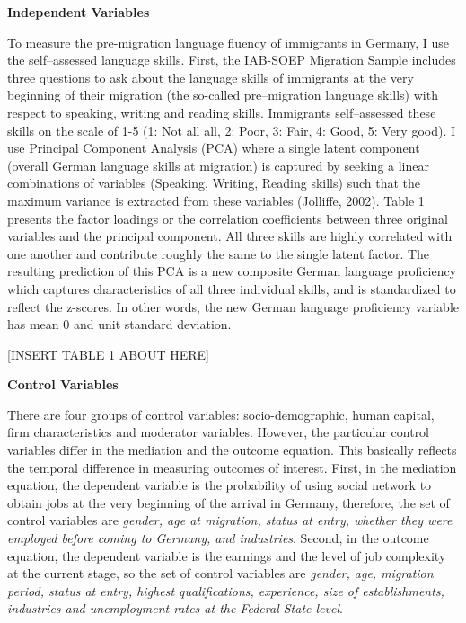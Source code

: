 \documentclass[12pt,a4paper]{article}
\begin{document}
\begin{flushleft}
\textbf{Independent Variables} 
\end{flushleft}

To measure the pre-migration language fluency of immigrants in Germany, I use the self--assessed language skills. First, the IAB-SOEP Migration Sample includes three questions to ask about the language skills of immigrants at the very beginning of their migration (the so-called pre--migration language skills) with respect to speaking, writing and reading skills. Immigrants self--assessed these skills on the scale of 1-5 (1: Not all all, 2: Poor, 3: Fair, 4: Good, 5: Very good). I use Principal Component Analysis (PCA) where a single latent component (overall German language skills at migration) is captured by seeking a linear combinations of variables (Speaking, Writing, Reading skills) such that the maximum variance is extracted from these variables (Jolliffe, 2002). Table 1 presents the factor loadings or the correlation coefficients between three original variables and the principal component. All three skills are highly correlated with one another and contribute roughly the same to the single latent factor. The resulting prediction of this PCA is a new composite German language proficiency which captures characteristics of all three individual skills, and is standardized to reflect the z-scores. In other words, the new German language proficiency variable has mean 0 and unit standard deviation. 

\begin{center}
[INSERT TABLE 1 ABOUT HERE]
\end{center}

\begin{flushleft}
\textbf{Control Variables} 
\end{flushleft}

There are four groups of control variables: socio-demographic, human capital, firm characteristics and moderator variables. However, the particular control variables differ in the mediation and the outcome equation. This basically reflects the temporal difference in measuring outcomes of interest. First, in the mediation equation, the dependent variable is the probability of using social network to obtain jobs at the very beginning of the arrival in Germany, therefore, the set of control variables are \textit{gender, age at migration, status at entry, whether they were employed before coming to Germany, and industries}. Second, in the outcome equation, the dependent variable is the earnings and the level of job complexity at the current stage, so the set of control variables are \textit{gender, age, migration period, status at entry, highest qualifications, experience, size of establishments, industries and unemployment rates at the Federal State level}.
\end{document}
